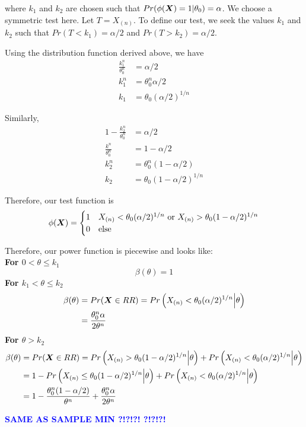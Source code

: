 \documentclass[]{article}
\newcommand{\bfX}{\mbox{\boldmath $X$}}
\begin{document}
where $k_1$ and $k_2$ are chosen such that $Pr(\phi(\bfX) = 1|\theta_0) = \alpha$. We choose a symmetric test here. Let $T = X_{(n)}$. To define our test, we seek the values $k_1$ and $k_2$ such that $Pr(T < k_1) = \alpha/2$ and $Pr(T > k_2) = \alpha/2$.

Using the distribution function derived above, we have
\[
\begin{split}
\frac{k_1^n}{\theta_0^n} &= \alpha/2 \\
k_1^n &= \theta_0^n\alpha/2 \\
k_1 &= \theta_0(\alpha/2)^{1/n}
\end{split}
\]

Similarly, 
\[
\begin{split}
1 - \frac{k_2^n}{\theta_0^n} &= \alpha/2 \\
\frac{k^n}{\theta_0^n} &= 1 - \alpha/2 \\
k_2^n &= \theta_0^n(1-\alpha/2) \\
k_2 &= \theta_0(1-\alpha/2)^{1/n}
\end{split}
\]

Therefore, our test function is
\[
\phi(\bfX) = \begin{cases}
1 & X_{(n)} < \theta_0(\alpha/2)^{1/n} \text{ or } X_{(n)} >  \theta_0(1-\alpha/2)^{1/n} \\
0 & \text{else}
\end{cases}
\]

Therefore, our power function is piecewise and looks like:\\
\textbf{For $0 < \theta \leq k_1$}
\[
\beta(\theta) = 1
\]
\textbf{For $k_1 < \theta \leq k_2$}
\[
\begin{split}
\beta(\theta) &= Pr(\bfX \in RR) = Pr\left(X_{(n)} < \theta_0(\alpha/2)^{1/n} \Big| \theta\right) \\
&= \frac{\theta_0^n\alpha}{2\theta^n}
\end{split}
\]
\textbf{For $\theta > k_2$}
\[
\begin{split}
\beta(\theta) &= Pr(\bfX \in RR) = Pr\left(X_{(n)} > \theta_0(1-\alpha/2)^{1/n} \Big| \theta\right) + Pr\left(X_{(n)} < \theta_0(\alpha/2)^{1/n} \Big| \theta\right) \\
&= 1 - Pr\left(X_{(n)}\leq \theta_0(1-\alpha/2)^{1/n} \Big| \theta\right) + Pr\left(X_{(n)} < \theta_0(\alpha/2)^{1/n} \Big| \theta\right) \\
&= 1 - \frac{\theta_0^n(1-\alpha/2)}{\theta^n} + \frac{\theta_0^n\alpha}{2\theta^n}
\end{split}
\]

\textcolor{blue}{\textbf{SAME AS SAMPLE MIN ?!?!?! ?!?!?!}}
\end{document}
